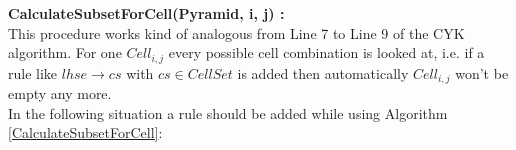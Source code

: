 \noindent \textbf{CalculateSubsetForCell(Pyramid, i, j) :}\\
This procedure works kind of analogous from Line 7 to Line 9 of the CYK algorithm. 
For one $Cell_{i,j}$ every possible cell combination is looked at, i.e. if a rule like $lhse \rightarrow cs$ with $cs \in CellSet$ is added then automatically $Cell_{i,j}$ won't be empty any more.\\

\noindent {}
In the following situation a rule should be added while using Algorithm \ref{CalculateSubsetForCell}:
\noindent
